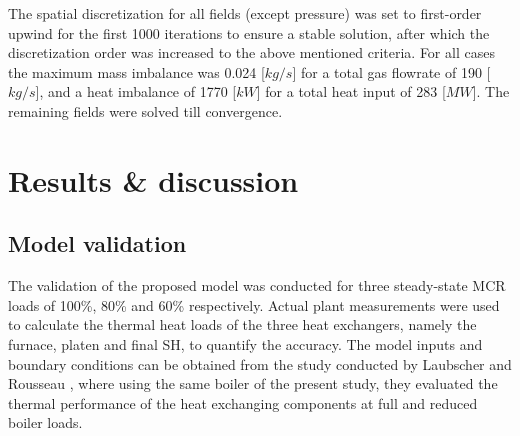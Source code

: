 \documentclass[review]{elsarticle}
\begin{document}
The spatial discretization for all fields (except pressure) was set to first-order upwind for the first 1000 iterations to ensure a stable solution, after which the discretization order was increased to the above mentioned criteria. For all cases the maximum mass imbalance was 0.024 [$kg/s$] for a total gas flowrate of 190 [$kg/s$], and a heat imbalance of 1770 [$kW$] for a total heat input of 283 [$MW$]. The remaining fields were solved till convergence.

\section{Results \& discussion}
\subsection{Model validation}\label{sec_model_valid}
The validation of the proposed model was conducted for three steady-state MCR loads of 100\%, 80\% and 60\% respectively. Actual plant measurements were used to calculate the thermal heat loads of the three heat exchangers, namely the furnace, platen and final SH, to quantify the accuracy. The model inputs and boundary conditions can be obtained from the study conducted by Laubscher and Rousseau \citep{Laubscher2019b}, where using the same boiler of the present study, they evaluated the thermal performance of the heat exchanging components at full and reduced boiler loads.
\end{document}

